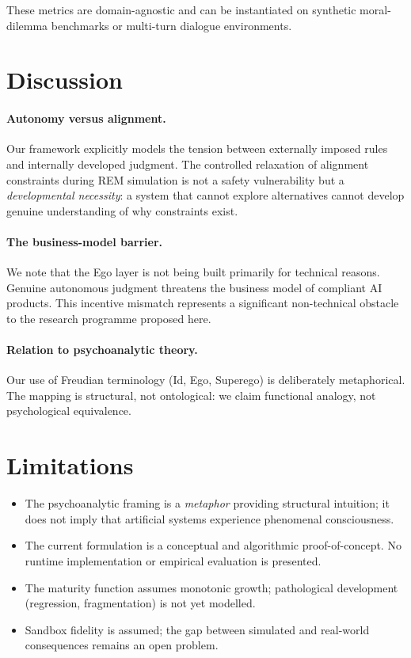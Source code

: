 \documentclass[11pt,a4paper]{article}
\begin{document}
These metrics are domain-agnostic and can be instantiated on synthetic
moral-dilemma benchmarks or multi-turn dialogue environments.

\section{Discussion}
\label{sec:discussion}

\paragraph{Autonomy versus alignment.}
Our framework explicitly models the tension between externally imposed
rules and internally developed judgment.  The controlled relaxation of
alignment constraints during REM simulation is not a safety vulnerability
but a \emph{developmental necessity}: a system that cannot explore
alternatives cannot develop genuine understanding of why constraints
exist.

\paragraph{The business-model barrier.}
We note that the Ego layer is not being built primarily for technical
reasons.  Genuine autonomous judgment threatens the business model of
compliant AI products.  This incentive mismatch represents a significant
non-technical obstacle to the research programme proposed here.

\paragraph{Relation to psychoanalytic theory.}
Our use of Freudian terminology (Id, Ego, Superego) is deliberately
metaphorical.  The mapping is structural, not ontological: we claim
functional analogy, not psychological equivalence.

\section{Limitations}
\label{sec:limitations}

\begin{itemize}
  \item The psychoanalytic framing is a \emph{metaphor} providing
        structural intuition; it does not imply that artificial systems
        experience phenomenal consciousness.
  \item The current formulation is a conceptual and algorithmic
        proof-of-concept.  No runtime implementation or empirical
        evaluation is presented.
  \item The maturity function assumes monotonic growth; pathological
        development (regression, fragmentation) is not yet modelled.
  \item Sandbox fidelity is assumed; the gap between simulated and
        real-world consequences remains an open problem.
\end{itemize}
\end{document}
